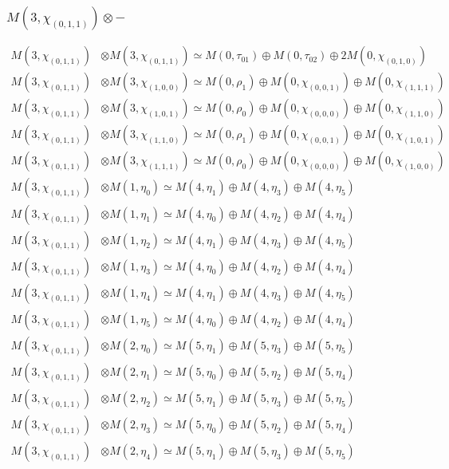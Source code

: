\subsubsection{$ M(3,\chi_{(0,1,1)})\otimes -$}
\begin{align*}
M(3,\chi_{(0,1,1)}) &\otimes M(3,\chi_{(0,1,1)}) \simeq M(0,\tau_{01}) \oplus M(0,\tau_{02}) \oplus 2 M(0,\chi_{(0,1,0)}) \\
M(3,\chi_{(0,1,1)}) &\otimes M(3,\chi_{(1,0,0)}) \simeq M(0,\rho_{1}) \oplus M(0,\chi_{(0,0,1)}) \oplus M(0,\chi_{(1,1,1)}) \\
M(3,\chi_{(0,1,1)}) &\otimes M(3,\chi_{(1,0,1)}) \simeq M(0,\rho_{0}) \oplus M(0,\chi_{(0,0,0)}) \oplus M(0,\chi_{(1,1,0)}) \\
M(3,\chi_{(0,1,1)}) &\otimes M(3,\chi_{(1,1,0)}) \simeq M(0,\rho_{1}) \oplus M(0,\chi_{(0,0,1)}) \oplus M(0,\chi_{(1,0,1)}) \\
M(3,\chi_{(0,1,1)}) &\otimes M(3,\chi_{(1,1,1)}) \simeq M(0,\rho_{0}) \oplus M(0,\chi_{(0,0,0)}) \oplus M(0,\chi_{(1,0,0)}) \\
M(3,\chi_{(0,1,1)}) &\otimes M(1,\eta_{0}) \simeq M(4,\eta_{1}) \oplus M(4,\eta_{3}) \oplus M(4,\eta_{5}) \\
M(3,\chi_{(0,1,1)}) &\otimes M(1,\eta_{1}) \simeq M(4,\eta_{0}) \oplus M(4,\eta_{2}) \oplus M(4,\eta_{4}) \\
M(3,\chi_{(0,1,1)}) &\otimes M(1,\eta_{2}) \simeq M(4,\eta_{1}) \oplus M(4,\eta_{3}) \oplus M(4,\eta_{5}) \\
M(3,\chi_{(0,1,1)}) &\otimes M(1,\eta_{3}) \simeq M(4,\eta_{0}) \oplus M(4,\eta_{2}) \oplus M(4,\eta_{4}) \\
M(3,\chi_{(0,1,1)}) &\otimes M(1,\eta_{4}) \simeq M(4,\eta_{1}) \oplus M(4,\eta_{3}) \oplus M(4,\eta_{5}) \\
M(3,\chi_{(0,1,1)}) &\otimes M(1,\eta_{5}) \simeq M(4,\eta_{0}) \oplus M(4,\eta_{2}) \oplus M(4,\eta_{4}) \\
M(3,\chi_{(0,1,1)}) &\otimes M(2,\eta_{0}) \simeq M(5,\eta_{1}) \oplus M(5,\eta_{3}) \oplus M(5,\eta_{5}) \\
M(3,\chi_{(0,1,1)}) &\otimes M(2,\eta_{1}) \simeq M(5,\eta_{0}) \oplus M(5,\eta_{2}) \oplus M(5,\eta_{4}) \\
M(3,\chi_{(0,1,1)}) &\otimes M(2,\eta_{2}) \simeq M(5,\eta_{1}) \oplus M(5,\eta_{3}) \oplus M(5,\eta_{5}) \\
M(3,\chi_{(0,1,1)}) &\otimes M(2,\eta_{3}) \simeq M(5,\eta_{0}) \oplus M(5,\eta_{2}) \oplus M(5,\eta_{4}) \\
M(3,\chi_{(0,1,1)}) &\otimes M(2,\eta_{4}) \simeq M(5,\eta_{1}) \oplus M(5,\eta_{3}) \oplus M(5,\eta_{5}) \\

\end{align*}
